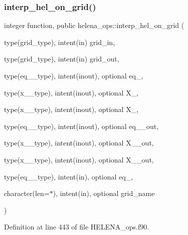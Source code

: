 \subsubsection{\texorpdfstring{interp\+\_\+hel\+\_\+on\+\_\+grid()}{interp\_hel\_on\_grid()}}
{\footnotesize\ttfamily integer function, public helena\+\_\+ops\+::interp\+\_\+hel\+\_\+on\+\_\+grid (\begin{DoxyParamCaption}\item[{type(grid\+\_\+type), intent(in)}]{grid\+\_\+in,  }\item[{type(grid\+\_\+type), intent(in)}]{grid\+\_\+out,  }\item[{type(eq\+\_\+2\+\_\+type), intent(inout), optional}]{eq\+\_,  }\item[{type(x\+\_\+1\+\_\+type), intent(inout), optional}]{X\+\_,  }\item[{type(x\+\_\+2\+\_\+type), intent(inout), optional}]{X\+\_,  }\item[{type(eq\+\_\+2\+\_\+type), intent(inout), optional}]{eq\+\_\+\_\+out,  }\item[{type(x\+\_\+1\+\_\+type), intent(inout), optional}]{X\+\_\+\_\+out,  }\item[{type(x\+\_\+2\+\_\+type), intent(inout), optional}]{X\+\_\+\_\+out,  }\item[{type(eq\+\_\+1\+\_\+type), intent(in), optional}]{eq\+\_,  }\item[{character(len=$\ast$), intent(in), optional}]{grid\+\_\+name }\end{DoxyParamCaption})}



Definition at line 443 of file H\+E\+L\+E\+N\+A\+\_\+ops.\+f90.

